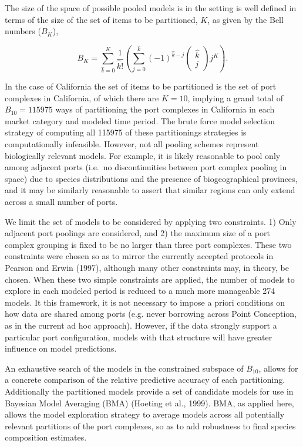 \documentclass[12pt]{article}
\begin{document}
The size of the space of possible pooled models is in the setting is
well defined in terms of the size of the set of items to be partitioned,
\(K\), as given by the Bell numbers (\(B_K\)),

\[B_K=\sum_{\hat k=0}^{K} \frac{1}{\hat k!} \left( \sum_{j=0}^{\hat k} (-1)^{\hat k -j} \left(\substack{\hat k \\ j}\right) j^K \right).\]

In the case of California the set of items to be partitioned is the set
of port complexes in California, of which there are \(K=10\), implying a
grand total of \(B_{10}=115975\) ways of partitioning the port complexes
in California in each market category and modeled time period. The brute
force model selection strategy of computing all 115975 of these
partitionings strategies is computationally infeasible. However, not all
pooling schemes represent biologically relevant models. For example, it
is likely reasonable to pool only among adjacent ports (i.e.~no
discontinuities between port complex pooling in space) due to species
distributions and the presence of biogeographical provinces, and it may
be similarly reasonable to assert that similar regions can only extend
across a small number of ports.

We limit the set of models to be considered by applying two constraints. 
1) Only adjacent port poolings are considered, and 2) the maximum size of a 
port complex grouping is fixed to be no larger than three port complexes. 
These two constraints were chosen so as to mirror the currently accepted 
protocols in Pearson and Erwin (1997), although many other constraints may, in 
theory, be chosen.
When these two simple constraints are applied, the number of models to
explore in each modeled period is reduced to a much more manageable 274
models. It this framework, it is not necessary to impose a priori conditions 
on how data are shared among ports (e.g. never borrowing across Point 
Conception, as in the current ad hoc approach). However, if the data strongly 
support a particular port configuration, models with that structure will have 
greater influence on model predictions.

An exhaustive search of the models in the constrained subspace of
\(B_{10}\), allows for a concrete comparison of the relative predictive
accuracy of each partitioning. Additionally the partitioned models
provide a set of candidate models for use in Bayesian Model Averaging
(BMA) (Hoeting et al., 1999). BMA, as applied here, allows the model
exploration strategy to average models across all potentially relevant
partitions of the port complexes, so as to add robustness to final
species composition estimates.
\end{document}
